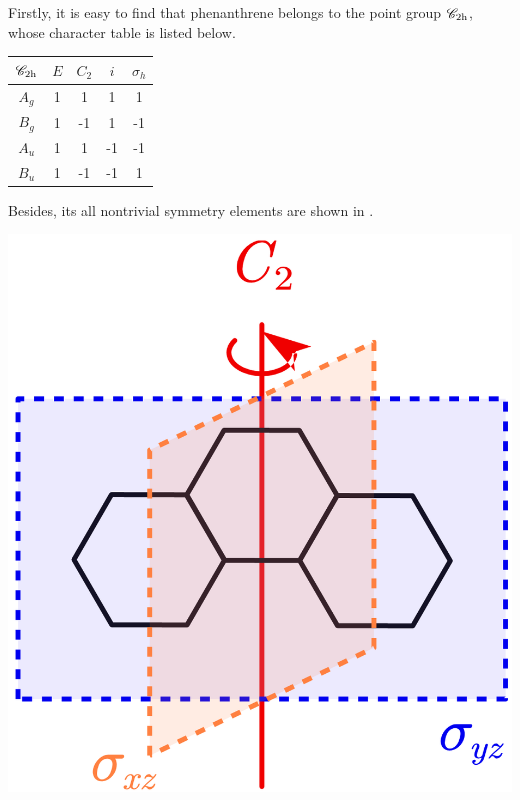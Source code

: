 		Firstly, it is easy to find that phenanthrene belongs to the point group $\mathscr{C}_{\rm 2h}$, whose character table is listed below.
		\begin{center}
		\setlength{\abovecaptionskip}{-0.1em}
		\begin{tabular}{ccccc}\hline
	$\mathscr{C}_{\rm 2h}$ & $E$ & $C_2$ & $i$ & $\sigma_h$ \\ \hline
			$A_g$	&	1	&	1	&	1	&	1	\\
			$B_g$	&	1	&	-1	&	1	&	-1	\\
			$A_u$	&	1	&	1	&	-1	&	-1	\\
			$B_u$ 	&	1	&	-1	&	-1	&	1	\\ \hline
		\end{tabular}
		\setlength{\belowcaptionskip}{-0.2em}
		\end{center}
		
		Besides, its all nontrivial symmetry elements are shown in .
		\begin{center}
		\includegraphics[scale=1.0]{./structures/exercise_1/phenanthrene/999.png}
		\label{fig:sym_elem_6}
		\end{center}	
		

